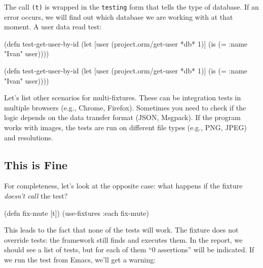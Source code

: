 \fi

The call \verb|(t)| is wrapped in the \verb|testing| form that tells the type of database. If an error occurs, we will find out which database we are working with at that moment. A user data read test:

\ifnarrow

\begin{english}
  \begin{clojure}
(defn test-get-user-by-id
  (let [user
        (project.orm/get-user *db* 1)]
    (is (= {:name "Ivan"} user))))
  \end{clojure}
\end{english}

\else

\begin{english}
  \begin{clojure}
(defn test-get-user-by-id
  (let [user (project.orm/get-user *db* 1)]
    (is (= {:name "Ivan"} user))))
  \end{clojure}
\end{english}

\fi

Let's list other scenarios for multi-fixtures. These can be integration tests in multiple browsers (e.g., Chrome, Firefox). Sometimes you need to check if the logic depends on the data transfer format (JSON, Msgpack). If the program works with images, the tests are run on different file types (e.g., PNG, JPEG) and resolutions.

\subsection{This is Fine}

For completeness, let's look at the opposite case: what happens if the fixture\emph{ doesn't call} the test?


\begin{english}
  \begin{clojure}
(defn fix-mute [t])
(use-fixtures :each fix-mute)
  \end{clojure}
\end{english}

This leads to the fact that none of the tests will work. The fixture does not override tests: the framework still finds and executes them. In the report, we should see a list of tests, but for each of them “0 assertions” will be indicated. If we run the test from Emacs, we'll get a warning:

